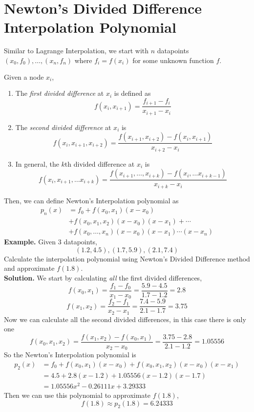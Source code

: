 \documentclass[openany]{report}
\begin{document}
\section{Newton's Divided Difference Interpolation Polynomial}
Similar to Lagrange Interpolation, we start with $n$ datapoints $(x_0,f_0),\ldots,(x_n,f_n)$ where $f_i = f(x_i)$ for some unknown function $f$. 
\begin{definition}
    Given a node $x_i$, 
    \begin{enumerate}
        \item The \emph{first divided difference} at $x_i$ is defined as 
        \[f(x_i,x_{i+1}) = \frac{f_{i+1}- f_i}{x_{i+1} - x_i}\]
        \item The \emph{second divided difference} at $x_i$ is 
        \[f(x_i, x_{i+1}, x_{i+2}) = \frac{f(x_{i+1}, x_{i+2}) - f(x_i,x_{i+1})}{x_{i+2}-x_i}\]
        \item In general, the $k$th divided difference at $x_i$ is 
        \[f(x_i, x_{i+1}, \ldots x_{i+k}) = \frac{f(x_{i+1},\ldots, x_{i+k}) - f(x_i, \ldots x_{i+k-1})}{x_{i+k}-x_i}\]
    \end{enumerate}
\end{definition}

Then, we can define Newton's Interpolation polynomial as 
\begin{align*}
    p_n(x) &= f_0 + f(x_0,x_1)(x-x_0)\\
    &+ f(x_0,x_1,x_2)(x-x_0)(x-x_1) + \cdots\\
    &+ f(x_0,\ldots,x_n)(x-x_0)(x-x_1)\cdots(x - x_n)
\end{align*}
\textbf{Example.} Given 3 datapoints, 
\[(1.2, 4.5), (1.7,5.9), (2.1,7.4) \]
Calculate the interpolation polynomial using Newton's Divided Difference method and approximate $f(1.8)$.\\[2ex]
\textbf{Solution.} We start by calculating \emph{all} the first divided differences,
\[f(x_0, x_1) = \frac{f_1 - f_0}{x_1 - x_0} = \frac{5.9-4.5}{1.7-1.2} = 2.8\]
\[f(x_1,x_2) = \frac{f_2-f_1}{x_2-x_1}=\frac{7.4-5.9}{2.1-1.7} = 3.75\]
Now we can calculate all the second divided differences, in this case there is only one 
\[f(x_0,x_1,x_2) = \frac{f(x_1, x_2) - f(x_0,x_1)}{x_2-x_0} = \frac{3.75 - 2.8}{2.1 - 1.2} = 1.05556\]
So the Newton's Interpolation polynomial is
\begin{align*}
    p_2(x) &= f_0 + f(x_0,x_1)(x-x_0) + f(x_0,x_1,x_2)(x-x_0)(x-x_1)\\
    &= 4.5 + 2.8(x-1.2) + 1.05556(x-1.2)(x-1.7)\\
    &= 1.05556x^2 - 0.26111x + 3.29333
\end{align*}
Then we can use this polynomial to approximate $f(1.8)$,
\[f(1.8) \approx p_2(1.8) = 6.24333\]
\end{document}
